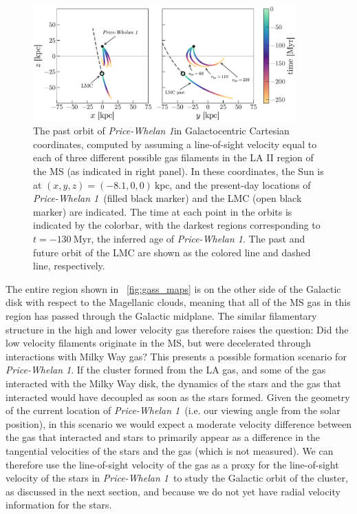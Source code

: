 \documentclass[twocolumn]{aastex62}
\newcommand{\kpc}{\textrm{kpc}}
\newcommand{\clustername}{\textsl{Price-Whelan 1}}
\begin{document}
\begin{figure}[t!]
\centering
\includegraphics[width=0.9\textwidth]{figures/orbits.pdf}
\caption{The past orbit of \clustername in Galactocentric Cartesian coordinates, computed by assuming a line-of-sight velocity equal to each of three different possible gas  filaments in the LA II region of the MS (as indicated in right panel).
In these coordinates, the Sun is at $(x, y, z) = (-8.1, 0, 0)~\kpc$, and the present-day locations of \clustername\ (filled black marker) and the LMC (open black marker) are indicated.
The time at each point in the orbits is indicated by the colorbar, with the darkest regions corresponding to $t = -130~\textrm{Myr}$, the inferred age of \clustername.
The past and future orbit of the LMC are shown as the colored line and dashed line, respectively.
}
\label{fig:orbits}
\end{figure}

The entire region shown in \figurename~\ref{fig:gass_maps} is on the other side of the Galactic disk with respect to the Magellanic clouds, meaning that all of the MS gas in this region has passed through the Galactic midplane.
The similar filamentary structure in the high and lower velocity gas therefore raises the question: Did the low velocity filaments originate in the MS, but were decelerated through interactions with Milky Way gas?
This presents a possible formation scenario for \clustername.
If the cluster formed from the LA gas, and some of the gas interacted with the Milky Way disk, the dynamics of the stars and the gas that interacted would have decoupled as soon as the stars formed.
Given the geometry of the current location of \clustername\ (i.e. our viewing angle from the solar position), in this scenario we would expect a moderate velocity difference between the gas that interacted and stars to primarily appear as a difference in the tangential velocities of the stars and the gas (which is not measured).
We can therefore use the line-of-sight velocity of the gas as a proxy for the line-of-sight velocity of the stars in \clustername\ to study the Galactic orbit of the cluster, as discussed in the next section, and because we do not yet have radial velocity information for the stars.
\end{document}
